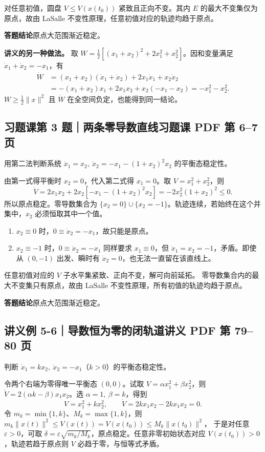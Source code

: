 \documentclass[UTF8,a4paper,11pt,fontset=fandol]{ctexart}
\begin{document}
对任意初值，圆盘 $V\le V(x(t_0))$ 紧致且正向不变。其内 $E$ 的最大不变集仅为原点，故由 LaSalle 不变性原理，任意初值对应的轨迹均趋于原点。

\textbf{答题结论}\quad 原点大范围渐近稳定。

\textbf{讲义的另一种做法。}
取 $W=\tfrac12[(x_1+x_2)^2+2x_1^2+x_2^2]$。因和变量满足 $\dot x_1+\dot x_2=-x_1$，有
\[
\begin{aligned}
 \dot W
 &=(x_1+x_2)(\dot x_1+\dot x_2)+2x_1\dot x_1+x_2\dot x_2\\
 &=-(x_1+x_2)x_1+2x_1x_2+x_2(-x_1-x_2)
 =-x_1^2-x_2^2 .
\end{aligned}
\]
$W\ge\tfrac12\lVert x\rVert^2$ 且 $\dot W$ 在全空间负定，也能得到同一结论。

\subsection*{习题课第 3 题｜两条零导数直线\hfill{\normalfont\small 习题课 PDF 第 6--7 页}}\label{prob:exercise3}
用第二法判断系统 $\dot x_1=x_2,\ \dot x_2=-x_1-(1+x_2)^2x_2$ 的平衡态稳定性。

由第一式得平衡时 $x_2=0$，代入第二式得 $x_1=0$。取 $V=x_1^2+x_2^2$，则
\[
 \dot V=2x_1x_2+2x_2[-x_1-(1+x_2)^2x_2]
       =-2x_2^2(1+x_2)^2\le0 .
\]
所以原点稳定。零导数集合为 $\{x_2=0\}\cup\{x_2=-1\}$。轨迹连续，若始终在这个并集中，$x_2$ 必须恒取其中一个值。
\begin{enumerate}
  \item $x_2\equiv0$ 时，$0\equiv\dot x_2=-x_1$，故只能是原点。
  \item $x_2\equiv-1$ 时，$0\equiv\dot x_2=-x_1$ 同样要求 $x_1\equiv0$，但 $\dot x_1=x_2=-1$，矛盾。即使从 $(0,-1)$ 出发、瞬时有 $\dot x_2=0$，也无法一直留在该直线上。
\end{enumerate}
任意初值对应的 $V$ 子水平集紧致、正向不变，解可向前延拓。
零导数集合内的最大不变集只有原点，故由 LaSalle 不变性原理，所有初值的轨迹均趋于原点。

\textbf{答题结论}\quad 原点大范围渐近稳定。

\newpage
\subsection*{讲义例 5-6｜导数恒为零的闭轨道\hfill{\normalfont\small 讲义 PDF 第 79--80 页}}
判断 $\dot x_1=kx_2,\ \dot x_2=-x_1$（$k>0$）的平衡态稳定性。

令两个右端为零得唯一平衡态 $(0,0)$。试取 $V=\alpha x_1^2+\beta x_2^2$，则 $\dot V=2(\alpha k-\beta)x_1x_2$。选 $\alpha=1,\ \beta=k$，得到
\[
 V=x_1^2+kx_2^2,\qquad
 \dot V=2kx_1x_2-2kx_1x_2=0 .
\]
令 $m_k=\min\{1,k\}$、$M_k=\max\{1,k\}$，则
$m_k\lVert x(t)\rVert^2\le V(x(t))=V(x(t_0))\le M_k\lVert x(t_0)\rVert^2$，
于是对任意 $\varepsilon>0$，可取 $\delta=\varepsilon\sqrt{m_k/M_k}$，原点稳定。任意非零初始状态对应 $V(x(t_0))>0$，轨迹若趋于原点则 $V$ 必趋于零，与恒等式矛盾。
\end{document}
